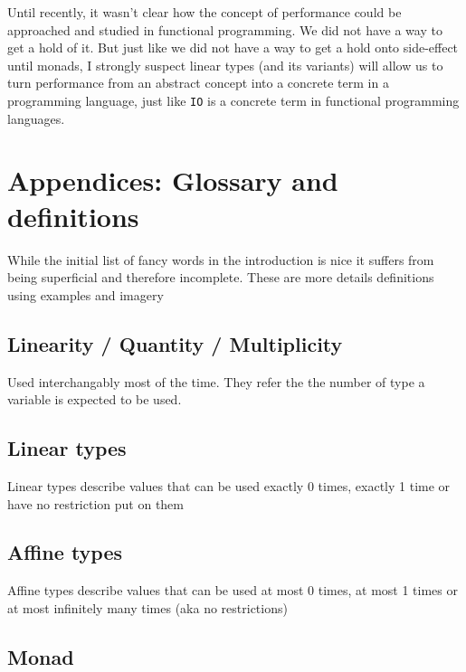 \documentclass[
]{article}
\begin{document}
Until recently, it wasn't clear how the concept of performance could be
approached and studied in functional programming. We did not have a way
to get a hold of it. But just like we did not have a way to get a hold
onto side-effect until monads, I strongly suspect linear types (and its
variants) will allow us to turn performance from an abstract concept
into a concrete term in a programming language, just like \texttt{IO} is
a concrete term in functional programming languages.

\hypertarget{appendices-glossary-and-definitions}{%
\section{Appendices: Glossary and
definitions}\label{appendices-glossary-and-definitions}}

While the initial list of fancy words in the introduction is nice it
suffers from being superficial and therefore incomplete. These are more
details definitions using examples and imagery

\hypertarget{linearity-quantity-multiplicity-1}{%
\subsection{Linearity / Quantity /
Multiplicity}\label{linearity-quantity-multiplicity-1}}

Used interchangably most of the time. They refer the the number of type
a variable is expected to be used.

\hypertarget{linear-types-1}{%
\subsection{Linear types}\label{linear-types-1}}

Linear types describe values that can be used exactly 0 times, exactly 1
time or have no restriction put on them

\hypertarget{affine-types}{%
\subsection{Affine types}\label{affine-types}}

Affine types describe values that can be used at most 0 times, at most 1
times or at most infinitely many times (aka no restrictions)

\hypertarget{monad}{%
\subsection{Monad}\label{monad}}
\end{document}
